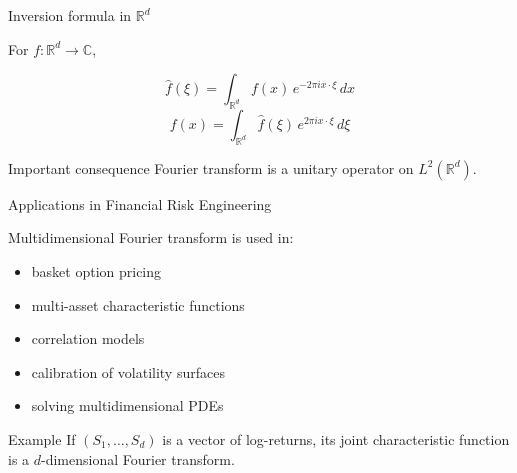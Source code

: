\documentclass[aspectratio=169]{beamer}
\begin{document}
\begin{frame}{Inversion formula in $\mathbb{R}^d$}

For $f:\mathbb{R}^d\to\mathbb{C}$,

\[
\hat f(\xi)=\int_{\mathbb{R}^d}
f(x)\,e^{-2\pi i x\cdot \xi}\,dx
\]
\pause
\[
f(x)=\int_{\mathbb{R}^d}
\hat f(\xi)\,e^{2\pi i x\cdot \xi}\,d\xi
\]

\begin{block}{Important consequence}
Fourier transform is a unitary operator on $L^2(\mathbb{R}^d)$.
\end{block}

\end{frame}

\begin{frame}{Applications in Financial Risk Engineering}

Multidimensional Fourier transform is used in:

\begin{itemize}
    \item basket option pricing
    \item multi-asset characteristic functions
    \item correlation models
    \item calibration of volatility surfaces
    \item solving multidimensional PDEs
\end{itemize}

\begin{block}{Example}
If $(S_1,\dots,S_d)$ is a vector of log-returns,
its joint characteristic function is a $d$-dimensional Fourier transform.
\end{block}

\end{frame}
\end{document}

